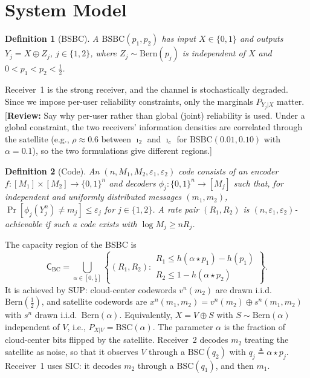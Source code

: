 \documentclass[conference]{IEEEtran}
\newtheorem{definition}{Definition}
\newcommand{\Csf}{\mathsf{C}}
\newcommand{\Bern}{\mathrm{Bern}}
\newcommand{\BSC}{\mathrm{BSC}}
\newcommand{\reviewnote}[1]{{\color{red}\footnotesize[\textbf{Review:} #1]}}
\begin{document}
\section{System Model}
\begin{definition}[BSBC]
A $\mathrm{BSBC}(p_1,p_2)$ has input $X\in\{0,1\}$ and outputs $Y_j=X\oplus Z_j$, $j\in\{1,2\}$, where $Z_j\sim\Bern(p_j)$ is independent of $X$ and $0<p_1<p_2<\frac12$.
\end{definition}
Receiver~1 is the strong receiver, and the channel is stochastically degraded. Since we impose per-user reliability constraints, only the marginals $P_{Y_j|X}$ matter.
\reviewnote{Say why per-user rather than global (joint) reliability is used. Under a global constraint, the two receivers' information densities are correlated through the satellite (e.g., $\rho\approx0.6$ between $\imath_2$ and $\imath_{\mathrm c}$ for $\mathrm{BSBC}(0.01,0.10)$ with $\alpha=0.1$), so the two formulations give different regions.}


\begin{definition}[Code]
An $(n,M_1,M_2,\varepsilon_1,\varepsilon_2)$ code consists of an encoder $f:[M_1]\times[M_2]\to\{0,1\}^n$ and decoders $\phi_j:\{0,1\}^n\to[M_j]$ such that, for independent and uniformly distributed messages $(m_1,m_2)$, $\Pr[\phi_j(Y_j^n)\neq m_j]\leq\varepsilon_j$ for $j\in\{1,2\}$. A rate pair $(R_1,R_2)$ is $(n,\varepsilon_1,\varepsilon_2)$-achievable if such a code exists with $\log M_j\geq nR_j$.
\end{definition}

The capacity region of the BSBC is~\cite{ElGamalKim:book}
\begin{equation}
\Csf_{\mathrm{BC}}=\bigcup_{\alpha\in[0,\frac12]}\left\{(R_1,R_2):\begin{array}{l}R_1\leq h(\alpha\star p_1)-h(p_1)\\ R_2\leq 1-h(\alpha\star p_2)\end{array}\right\}.
\label{eq:capacity}
\end{equation}
It is achieved by SUP: cloud-center codewords $v^n(m_2)$ are drawn i.i.d.\ $\Bern(\frac12)$, and satellite codewords are $x^n(m_1,m_2)=v^n(m_2)\oplus s^n(m_1,m_2)$ with $s^n$ drawn i.i.d.\ $\Bern(\alpha)$. Equivalently, $X=V\oplus S$ with $S\sim\Bern(\alpha)$ independent of $V$, i.e., $P_{X|V}=\BSC(\alpha)$. The parameter $\alpha$ is the fraction of cloud-center bits flipped by the satellite. Receiver~2 decodes $m_2$ treating the satellite as noise, so that it observes $V$ through a $\BSC(q_2)$ with $q_j\triangleq\alpha\star p_j$. Receiver~1 uses SIC: it decodes $m_2$ through a $\BSC(q_1)$, and then $m_1$.
\end{document}
